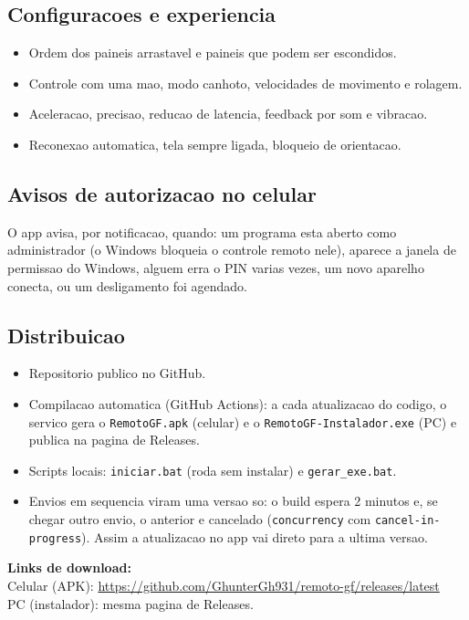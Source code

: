 \documentclass[11pt,a4paper]{article}
\begin{document}
\subsection{Configuracoes e experiencia}
\begin{itemize}
  \item Ordem dos paineis arrastavel e paineis que podem ser escondidos.
  \item Controle com uma mao, modo canhoto, velocidades de movimento e rolagem.
  \item Aceleracao, precisao, reducao de latencia, feedback por som e vibracao.
  \item Reconexao automatica, tela sempre ligada, bloqueio de orientacao.
\end{itemize}

\subsection{Avisos de autorizacao no celular}
O app avisa, por notificacao, quando: um programa esta aberto como administrador
(o Windows bloqueia o controle remoto nele), aparece a janela de permissao do Windows,
alguem erra o PIN varias vezes, um novo aparelho conecta, ou um desligamento foi agendado.

\subsection{Distribuicao}
\begin{itemize}
  \item Repositorio publico no GitHub.
  \item Compilacao automatica (GitHub Actions): a cada atualizacao do codigo, o servico
  gera o \texttt{RemotoGF.apk} (celular) e o \texttt{RemotoGF-Instalador.exe} (PC) e publica
  na pagina de Releases.
  \item Scripts locais: \texttt{iniciar.bat} (roda sem instalar) e \texttt{gerar\_exe.bat}.
  \item Envios em sequencia viram uma versao so: o build espera 2 minutos e, se chegar outro
  envio, o anterior e cancelado (\texttt{concurrency} com \texttt{cancel-in-progress}). Assim a
  atualizacao no app vai direto para a ultima versao.
\end{itemize}

\begin{nota}
\textbf{Links de download:}\\
Celular (APK): \url{https://github.com/GhunterGh931/remoto-gf/releases/latest}\\
PC (instalador): mesma pagina de Releases.
\end{nota}
\end{document}

